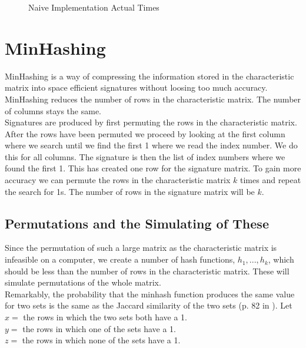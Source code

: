 \documentclass[a4paper,11pt]{article}
\begin{document}
\begin{figure}[!htbp]
    \begin{center}
        
        \caption{Naive Implementation Actual Times}
        \label{fig:naive_at}
    \end{center}
\end{figure}


\section{MinHashing}\label{sec:minhashing}
MinHashing is a way of compressing the information stored in the characteristic matrix into space efficient signatures without loosing too much accuracy. MinHashing reduces the number of rows in the characteristic matrix. The number of columns stays the same.\\

Signatures are produced by first permuting the rows in the characteristic matrix. After the rows have been permuted we proceed by looking at the first column where we search until we find the first 1 where we read the index number. We do this for all columns. The signature is then the list of index numbers where we found the first 1. This has created one row for the signature matrix. To gain more accuracy we can permute the rows in the characteristic matrix $k$ times and repeat the search for 1s. The number of rows in the signature matrix will be $k$.

\subsection{Permutations and the Simulating of These}
Since the permutation of such a large matrix as the characteristic matrix is infeasible on a computer, we create a number of hash functions, $h_1, ..., h_k$, which should be less than the number of rows in the characteristic matrix. These will simulate permutations of the whole matrix.\\

Remarkably, the probability that the minhash function produces the same value for two sets is the same as the Jaccard similarity of the two sets (p. 82 in \cite{book:mmds}). Let \\

    $x = $ the rows in which the two sets both have a 1. \\
    $y = $ the rows in which one of the sets have a 1. \\
    $z = $ the rows in which none of the sets have a 1. \\
\end{document}
